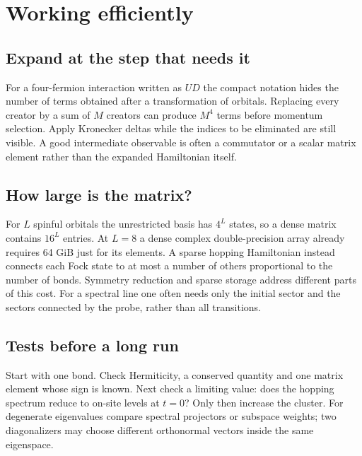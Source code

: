 \chapter{Working efficiently}
\section{Expand at the step that needs it}
For a four-fermion interaction written as $U D$ the compact notation
hides the number of terms obtained after a transformation of orbitals.
Replacing every creator by a sum of $M$ creators can produce $M^4$
terms before momentum selection. Apply Kronecker deltas while the
indices to be eliminated are still visible. A good intermediate
observable is often a commutator or a scalar matrix element rather
than the expanded Hamiltonian itself.

\section{How large is the matrix?}
For $L$ spinful orbitals the unrestricted basis has $4^L$ states, so
a dense matrix contains $16^L$ entries. At $L=8$ a dense complex
double-precision array already requires 64 GiB just for its elements.
A sparse hopping Hamiltonian instead connects each Fock state to at
most a number of others proportional to the number of bonds. Symmetry
reduction and sparse storage address different parts of this cost.
For a spectral line one often needs only the initial sector and the
sectors connected by the probe, rather than all transitions.

\section{Tests before a long run}
Start with one bond. Check Hermiticity, a conserved quantity and
one matrix element whose sign is known. Next check a limiting value:
does the hopping spectrum reduce to on-site levels at $t=0$? Only
then increase the cluster. For degenerate eigenvalues compare spectral
projectors or subspace weights; two diagonalizers may choose different
orthonormal vectors inside the same eigenspace.

